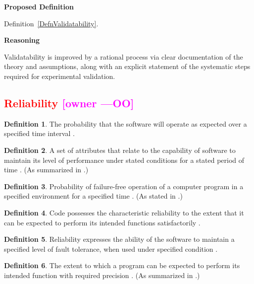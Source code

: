 \documentclass[letterpaper,cleveref]{lipics-v2019}
\newcommand{\authornote}[3]{\textcolor{#1}{[#3 ---#2]}}
\newcommand{\authornote}[3]{}
\newcommand{\oo}[1]{\authornote{magenta}{OO}{#1}} %
\newcommand{\notdone}[1]{\textcolor{red}{#1}}
\theoremstyle{definition}
\newtheorem{defn}{Definition}
\begin{document}
\noindent \textbf{Proposed Definition}

Definition~\ref{DefnValidatability}.

\noindent \textbf{Reasoning}

Validatability is improved by a rational process via clear documentation of the
theory and assumptions, along with an explicit statement of the systematic steps
required for experimental validation.

\subsection{\notdone{Reliability} \oo{owner}}

\begin{defn}
	The probability that the software will operate as expected over a specified
	time interval \citep{GhezziEtAl2003}.
\end{defn}

\begin{defn}
	A set of attributes that relate to the capability of software to maintain its
	level of performance under stated conditions for a stated period of time \citep{international2001iso}. (As summarized in \citep{berander2005software}.)
\end{defn}

\begin{defn} \label{reliabilitySelected1}
	Probability of failure-free operation of a computer program in a specified environment for a specified time \citep{musa1987software}. (As stated in \citep{pressman2005software}.)
\end{defn}

\begin{defn}
	Code possesses the characteristic reliability to the extent that it can be
	expected to perform its intended functions satisfactorily
	\citep{boehm1976quantitative}.
\end{defn}

\begin{defn} \label{reliabilitySelected2}
   Reliability expresses the ability of the software to maintain a specified
   level of fault tolerance, when used under specified condition \citep{singh2013different}.
\end{defn}
\begin{defn}
	The extent to which a program can be expected to perform its intended
	function with required precision \citep{McCallEtAl1977}. (As summarized in
    \citet{VanVliet2000}.)
\end{defn}
\end{document}
